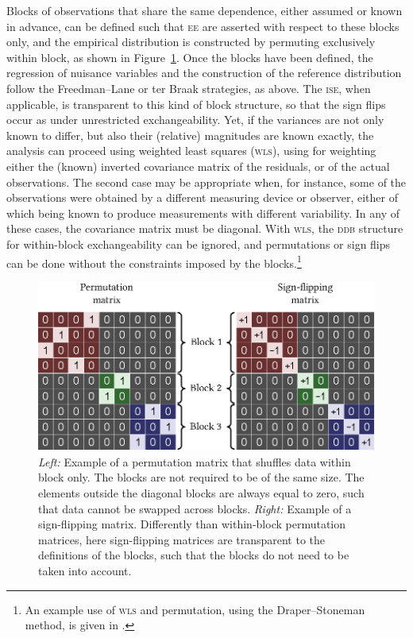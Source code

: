 Blocks of observations that share the same dependence, either assumed or known in advance, can be defined such that \textsc{ee} are asserted with respect to these blocks only, and the empirical distribution is constructed by permuting exclusively within block, as shown in Figure~\ref{fig:within-block}. Once the blocks have been defined, the regression of nuisance variables and the construction of the reference distribution follow the Freedman--Lane or ter Braak strategies, as above. The \textsc{ise}, when applicable, is transparent to this kind of block structure, so that the sign flips occur as under unrestricted exchangeability. Yet, if the variances are not only known to differ, but also their (relative) magnitudes are known exactly, the analysis can proceed using weighted least squares (\textsc{wls)}, using for weighting either the (known) inverted covariance matrix of the residuals, or of the actual observations. The second case may be appropriate when, for instance, some of the observations were obtained by a different measuring device or observer, either of which being known to produce measurements with different variability. In any of these cases, the covariance matrix must be diagonal. With \textsc{wls}, the \textsc{ddb} structure for within-block exchangeability can be ignored, and permutations or sign flips can be done without the constraints imposed by the blocks.\footnote{An example use of \textsc{wls} and permutation, using the Draper--Stoneman method, is given in \citet{OGorman2005}.}

\begin{figure}[!p]
\centering
\includegraphics{images/within-block.eps}
\caption[Example of a within-block permutation matrix.]{\emph{Left:} Example of a permutation matrix that shuffles data within block only. The blocks are not required to be of the same size. The elements outside the diagonal blocks are always equal to zero, such that data cannot be swapped across blocks. \emph{Right:} Example of a sign-flipping matrix. Differently than within-block permutation matrices, here sign-flipping matrices are transparent to the definitions of the blocks, such that the blocks do not need to be taken into account.}
\label{fig:within-block}
\end{figure}

